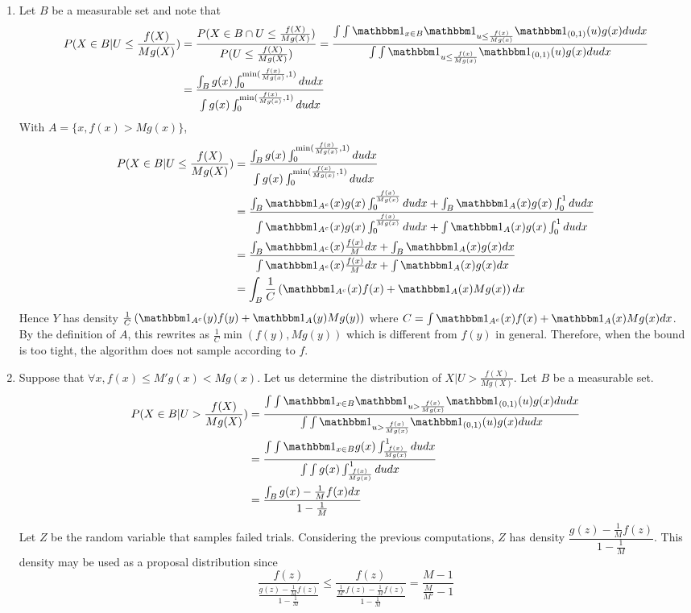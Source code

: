 \documentclass[a4paper,11pt]{article}
\begin{document}
\begin{enumerate}[label=(\alph*)]
  \item Let $B$ be a measurable set and note that $$\begin{aligned}
    P(X\in B| U\leq \frac{f(X)}{Mg(X)}) &= \frac{P(X\in B \cap U\leq \frac{f(X)}{Mg(X)})}{P(U\leq \frac{f(X)}{Mg(X)})} = \frac{\int\int \mathbbm 1_{x\in B} \mathbbm 1_{u\leq \frac{f(x)}{Mg(x)}}\mathbbm 1_{(0,1)}(u)g(x) du dx}{\int \int \mathbbm 1_{u\leq \frac{f(x)}{Mg(x)}}\mathbbm 1_{(0,1)}(u)g(x)dudx}\\
    &= \frac{\int_B g(x)\int_0^{\min(\frac{f(x)}{Mg(x)},1)} du dx}{\int g(x)\int_0^{\min(\frac{f(x)}{Mg(x)},1)} du dx}
  \end{aligned}$$
  With $A=\{x, f(x)>Mg(x)\}$, $$\begin{aligned}
    P(X\in B| U\leq \frac{f(X)}{Mg(X)}) &= \frac{\int_B g(x)\int_0^{\min(\frac{f(x)}{Mg(x)},1)} du dx}{\int g(x)\int_0^{\min(\frac{f(x)}{Mg(x)},1)} du dx} \\ &= \frac{\int_B \mathbbm 1_{A^c}(x) g(x)\int_0^{\frac{f(x)}{Mg(x)}} du dx + \int_B \mathbbm 1_{A}(x) g(x)\int_0^{1} du dx}{\int \mathbbm 1_{A^c}(x) g(x)  \int_0^{\frac{f(x)}{Mg(x)}} du dx + \int \mathbbm 1_{A}(x) g(x)\int_0^{1} du dx} \\
    &= \frac{\int_B \mathbbm 1_{A^c}(x) \frac{f(x)}M dx + \int_B \mathbbm 1_{A}(x) g(x)dx}{\int \mathbbm 1_{A^c}(x) \frac{f(x)}M dx + \int \mathbbm 1_{A}(x) g(x)dx}\\ &= \int_B \frac 1C  \left(\mathbbm 1_{A^c}(x) f(x) + \mathbbm 1_{A}(x) Mg(x)\right) dx
    \end{aligned}$$
    Hence $Y$ has density $\frac 1C  \left(\mathbbm 1_{A^c}(y) f(y) + \mathbbm 1_{A}(y) Mg(y)\right)$ where $C=\int \mathbbm 1_{A^c}(x) f(x) + \mathbbm 1_{A}(x) Mg(x)dx$. By the definition of $A$, this rewrites as $\frac 1C \min(f(y), Mg(y))$ which is different from $f(y)$ in general. Therefore, when the bound is too tight, the algorithm does not sample according to $f$.

    \item Suppose that $\forall x, f(x)\leq M' g(x) < M g(x)$. Let us determine the distribution of $X|U>\frac{f(X)}{Mg(X)}$. Let $B$ be a measurable set. $$\begin{aligned}
      P(X\in B|U>\frac{f(X)}{Mg(X)}) &= \frac{\int \int \mathbbm 1_{x\in B} \mathbbm 1_{u>\frac{f(x)}{Mg(x)}} \mathbbm 1_{(0,1)}(u) g(x) du dx}{\int \int \mathbbm 1_{u>\frac{f(x)}{Mg(x)}} \mathbbm 1_{(0,1)}(u) g(x) du dx}\\
      &= \frac{\int \int \mathbbm 1_{x\in B} g(x)\int_{\frac{f(x)}{Mg(x)}}^1 du dx}{\int \int g(x)\int_{\frac{f(x)}{Mg(x)}}^1 du dx}\\
      &= \frac{\int_B g(x)-\frac 1M f(x) dx}{1-\frac 1M}
    \end{aligned}$$
    Let $Z$ be the random variable that samples failed trials. Considering the previous computations, $Z$ has density $\dfrac{g(z)-\frac 1M f(z)}{1-\frac 1M}$. This density may be used as a proposal distribution since $$\frac{f(z)}{\frac{g(z)-\frac 1M f(z)}{1-\frac 1M}} \leq \frac{f(z)}{\frac{\frac{1}{M'}f(z)-\frac 1M f(z)}{1-\frac 1M}} = \frac{M-1}{\frac{M}{M'}-1}$$
\end{enumerate}
\end{document}
